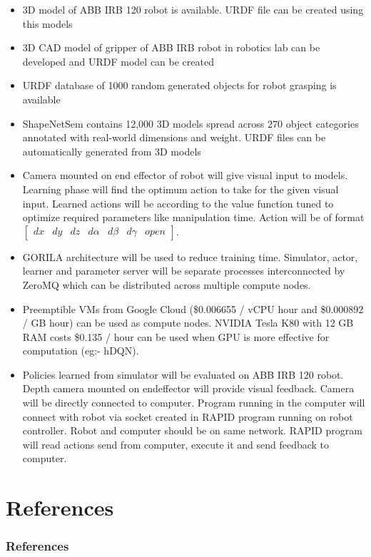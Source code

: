 \documentclass{beamer}
\begin{document}
\begin{frame}[allowframebreaks]
		\begin{itemize}
			\item 3D model of ABB IRB 120 robot is available. URDF file can be created using this models
			\item 3D CAD model of gripper of ABB IRB robot in robotics lab can be developed and URDF model can be created
			\item URDF database of 1000 random generated objects for robot grasping is available \cite{pdbrandom}
			\item ShapeNetSem \cite{shapenet2015}  contains 12,000 3D models spread across 270 object categories annotated with real-world dimensions and weight. URDF files can be automatically generated from 3D models
			\item Camera mounted on end effector of robot will give visual input to models. Learning phase will find the optimum action to take for the given visual input. Learned actions will be according to the value function tuned to optimize required parameters like manipulation time. Action will be of format $\begin{bmatrix}
			dx & dy & dz & d\alpha & d\beta & d\gamma & open\end{bmatrix}$. 
			\item GORILA architecture \cite{gorila} will be used to reduce training time. Simulator, actor, learner and parameter server will be separate processes interconnected by ZeroMQ \cite{zeromq} which can be distributed across multiple compute nodes.
			\item Preemptible VMs from Google Cloud \cite{gcppricing} (\$0.006655 / vCPU hour and \$0.000892 / GB hour) can be used as compute nodes. NVIDIA Tesla K80 with 12 GB RAM costs \$0.135 / hour can be used when GPU is more effective for computation (eg:- hDQN).
			\item Policies learned from simulator will be evaluated on ABB IRB 120 robot. Depth camera mounted on endeffector will provide visual feedback. Camera will be directly connected to computer. Program running in the computer will connect with robot via socket created in RAPID \cite{rapid} program running on robot controller. Robot and computer should be on same network. RAPID program will read actions send from computer, execute it and send feedback to computer.
		\end{itemize}
	\end{frame}

	\section{References}
	\begin{frame}[allowframebreaks]
		\frametitle{References}
		
		
				
	\end{frame}
	
\end{document}
